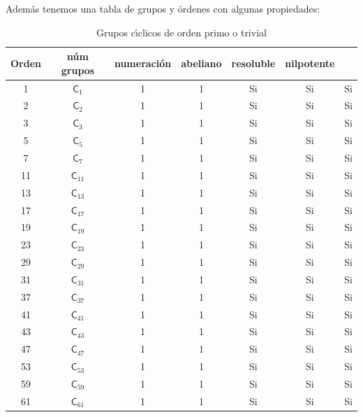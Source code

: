 \documentclass[final,12pt,a4paper,twoside,fleqn]{extbook}
\newcommand{\grclass}[1]{\ensuremath{\mathsf{#1}}}
\newcommand{\cyclicgr}[1]{\ensuremath{{\grclass{C}}_{#1}}}
\theoremstyle{definition}
\theoremstyle{remark}
\begin{document}
Adem\'as tenemos una tabla de grupos y \'ordenes con algunas propiedades:

\begin{table}[h!]
  \begin{center}
    \caption{Grupos c{\'{\i}}clicos de orden primo o trivial}
    \label{tab:GruposCiclicosSimplesCayleyTable}
    \begin{tabular}{|c|c|c|c|c|c|c|}
    \hline
      \tiny{\textbf{Orden}} & \tiny{\textbf{n\'um grupos}} & \tiny{\textbf{numeraci\'on}} & \tiny{\textbf{abeliano}} & \tiny{\textbf{resoluble}} & \tiny{\textbf{nilpotente}}\\
      \hline
      1&$\cyclicgr{1}$ & 1 & 1& Si & Si & Si\\
      \hline
      2&$\cyclicgr{2}$ & 1 & 1& Si & Si  & Si\\
      \hline
      3&$\cyclicgr{3}$ & 1 & 1& Si & Si  & Si\\
      \hline
      5&$\cyclicgr{5}$ & 1 & 1 & Si   & Si & Si\\
      \hline
      7&$\cyclicgr{7}$ & 1 & 1 & Si  &  Si & Si\\
      \hline
      11&$\cyclicgr{11}$ & 1 & 1 & Si  &  Si & Si\\
      \hline
      13&$\cyclicgr{13}$ & 1 & 1 & Si  &  Si & Si\\
      \hline
      17&$\cyclicgr{17}$ & 1 & 1 & Si  &  Si & Si\\
      \hline
      19&$\cyclicgr{19}$ & 1 & 1 & Si  &  Si & Si\\
      \hline
      23&$\cyclicgr{23}$ & 1 & 1 & Si  &  Si & Si\\
      \hline
      29&$\cyclicgr{29}$ & 1 & 1 & Si &  Si & Si\\
      \hline
      31&$\cyclicgr{31}$ & 1 & 1 & Si  & Si & Si\\
      \hline
      37&$\cyclicgr{37}$ & 1 & 1 & Si  &  Si & Si\\
      \hline
      41&$\cyclicgr{41}$ & 1 & 1 & Si  & Si & Si\\
      \hline
      43&$\cyclicgr{43}$ & 1 & 1 & Si  & Si & Si\\
      \hline
      47&$\cyclicgr{47}$ & 1 & 1 & Si  &  Si & Si\\
      \hline
      53&$\cyclicgr{53}$ & 1 & 1 & Si  &  Si & Si\\
      \hline
      59&$\cyclicgr{59}$ & 1 & 1 & Si  &  Si & Si\\
      \hline
      61&$\cyclicgr{61}$ & 1 & 1 & Si  &  Si & Si\\
      \hline
    \end{tabular}
  \end{center}
\end{table}
\end{document}
